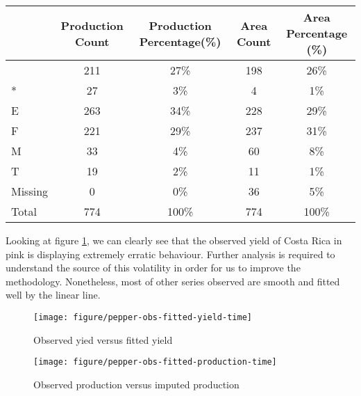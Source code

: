 \documentclass[nojss]{jss}\usepackage[]{graphicx}\usepackage[]{color}
\makeatletter
\def\maxwidth{ %
  \ifdim\Gin@nat@width>\linewidth
    \linewidth
  \else
    \Gin@nat@width
  \fi
}
\newenvironment{knitrout}{}{} %
\makeatother
\begin{document}
\begin{table}[ht]
\centering
\begin{tabular}{|l|c|c|c|c|}
  \hline
 & Production Count & Production Percentage(\%) & Area Count & Area Percentage (\%) \\ 
  \hline
  & 211 & 27\% & 198 & 26\% \\ 
  * & 27 & 3\% & 4 & 1\% \\ 
  E & 263 & 34\% & 228 & 29\% \\ 
  F & 221 & 29\% & 237 & 31\% \\ 
  M & 33 & 4\% & 60 & 8\% \\ 
  T & 19 & 2\% & 11 & 1\% \\ 
  Missing & 0 & 0\% & 36 & 5\% \\ 
  Total & 774 & 100\% & 774 & 100\% \\ 
   \hline
\end{tabular}
\end{table}






Looking at figure \ref{fig:pepper-obs-fitted-yield-time}, we can
clearly see that the observed yield of Costa Rica in pink is
displaying extremely erratic behaviour. Further analysis is required
to understand the source of this volatility in order for us to improve
the methodology. Nonetheless, most of other series observed are smooth
and fitted well by the linear line.

\begin{knitrout}
\color{fgcolor}\begin{figure}[!ht]


{\centering \texttt{[image: figure/pepper-obs-fitted-yield-time]} 

}

\caption[Observed yied versus fitted yield]{Observed yied versus fitted yield\label{fig:pepper-obs-fitted-yield-time}}
\end{figure}


\end{knitrout}


\begin{knitrout}
\color{fgcolor}\begin{figure}[!ht]


{\centering \texttt{[image: figure/pepper-obs-fitted-production-time]} 

}

\caption[Observed production versus imputed production]{Observed production versus imputed production\label{fig:pepper-obs-fitted-production-time}}
\end{figure}


\end{knitrout}
\end{document}
